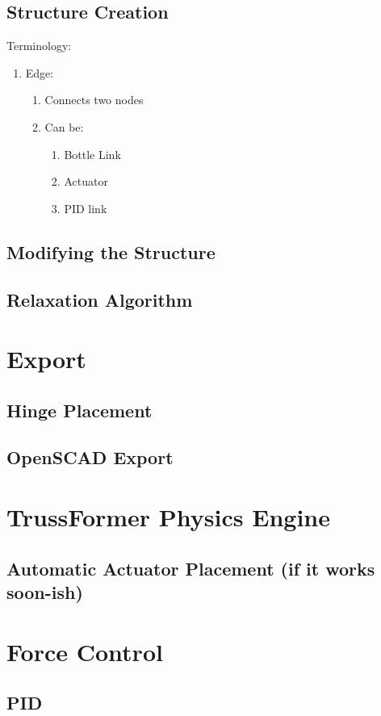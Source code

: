 \subsection{Structure Creation}
Terminology:\\
\begin{enumerate}
    \item Edge:
    \begin{enumerate}
        \item Connects two nodes
        \item Can be:
        \begin{enumerate}
            \item Bottle Link
            \item Actuator
            \item PID link
        \end{enumerate}
    \end{enumerate}
\end{enumerate}

\subsection{Modifying the Structure}

\subsection{Relaxation Algorithm}\label{sec:relaxation}

\section{Export}

\subsection{Hinge Placement}\label{sec:hinge_placement_impl}

\subsection{OpenSCAD Export}\label{sec:openscad_impl}

\section{TrussFormer Physics Engine}

\subsection{Automatic Actuator Placement (if it works soon-ish)}

\section{Force Control}

\subsection{PID}\label{sec:pid}
